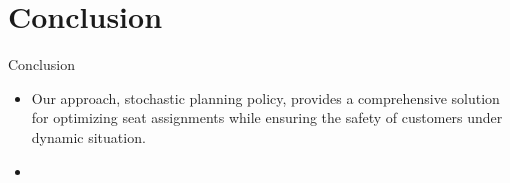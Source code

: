 
\section{Conclusion}
\frame{\sectionpage}

\begin{frame}{Conclusion}
    \begin{itemize}
        \item Our approach, stochastic planning policy, provides a comprehensive solution for optimizing seat assignments while ensuring the safety of customers under dynamic situation.
        \item 
    \end{itemize}
\end{frame}
